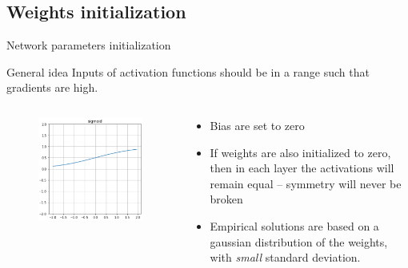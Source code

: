 \documentclass[xcolor=pdftex,dvipsnames,table,mathserif]{beamer}
\begin{document}
\subsection{Weights initialization}


\begin{frame}{Network parameters initialization}

\begin{block}{General idea}
          Inputs of activation functions should be in a range such that gradients are high.
\end{block}

  \begin{columns}
    \begin{column}{.3\textwidth}
      \begin{figure}[ht]
        \centering
        \includegraphics[width=\textwidth]{act_sigm.png}
      \end{figure}

    \end{column}

    \begin{column}{.7\textwidth}
      \begin{itemize}
      \item Bias are set to zero
      \item If weights are also initialized to zero, then in each layer the activations will remain equal -- symmetry will never be broken
      \item Empirical solutions are based on a gaussian distribution of the weights, with \textit{small} standard deviation.
      \end{itemize}
    \end{column}
  \end{columns}
\end{frame}
\end{document}

